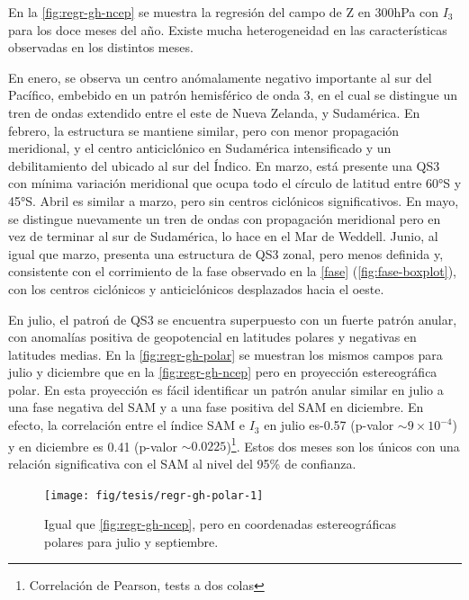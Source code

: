\documentclass[spanish,a4paper,12pt,oneside]{book}
\let\rmarkdownfootnote\footnote%
\def\footnote{\protect\rmarkdownfootnote}
\begin{document}
En la \autoref{fig:regr-gh-ncep} se muestra la regresión del campo de Z
en 300hPa con \(I_3\) para los doce meses del año. Existe mucha
heterogeneidad en las características observadas en los distintos meses.

En enero, se observa un centro anómalamente negativo importante al sur
del Pacífico, embebido en un patrón hemisférico de onda 3, en el cual se
distingue un tren de ondas extendido entre el este de Nueva Zelanda, y
Sudamérica. En febrero, la estructura se mantiene similar, pero con
menor propagación meridional, y el centro anticiclónico en Sudamérica
intensificado y un debilitamiento del ubicado al sur del Índico. En
marzo, está presente una QS3 con mínima variación meridional que ocupa
todo el círculo de latitud entre 60°S y 45°S. Abril es similar a marzo,
pero sin centros ciclónicos significativos. En mayo, se distingue
nuevamente un tren de ondas con propagación meridional pero en vez de
terminar al sur de Sudamérica, lo hace en el Mar de Weddell. Junio, al
igual que marzo, presenta una estructura de QS3 zonal, pero menos
definida y, consistente con el corrimiento de la fase observado en la
\autoref{fase} (\autoref{fig:fase-boxplot}), con los centros ciclónicos
y anticiclónicos desplazados hacia el oeste.

En julio, el patroń de QS3 se encuentra superpuesto con un fuerte patrón
anular, con anomalías positiva de geopotencial en latitudes polares y
negativas en latitudes medias. En la \autoref{fig:regr-gh-polar} se
muestran los mismos campos para julio y diciembre que en la
\autoref{fig:regr-gh-ncep} pero en proyección estereográfica polar. En
esta proyección es fácil identificar un patrón anular similar en julio a
una fase negativa del SAM y a una fase positiva del SAM en diciembre. En
efecto, la correlación entre el índice SAM e \(I_3\) en julio es-0.57
(p-valor \(\sim 9\times 10^{-4}\)) y en diciembre es 0.41 (p-valor
\(\sim 0.0225\))\footnote{Correlación de Pearson, tests a dos colas}.
Estos dos meses son los únicos con una relación significativa con el SAM
al nivel del 95\% de confianza.

\begin{figure}
\texttt{[image: fig/tesis/regr-gh-polar-1]} \caption{Igual que \autoref{fig:regr-gh-ncep}, pero en coordenadas estereográficas polares para julio y septiembre.}\label{fig:regr-gh-polar}
\end{figure}
\end{document}
